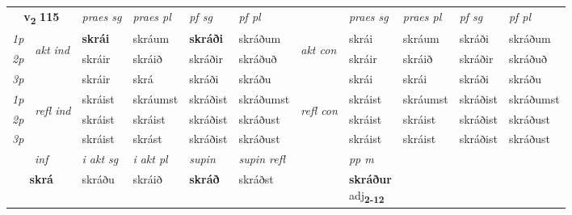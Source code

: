 \noindent
\begin{tabular}{lllllllllll} \toprule
\multicolumn{2}{c}{\textbf{v{\textsubscript{2}}} \Large{\textbf{115}}}  &  \textit{praes sg}  & \textit{praes pl}  &\textit{ pf sg} & \textit{pf pl} &  &  \textit{praes sg}  & \textit{praes pl}  & \textit{pf sg} & \textit{pf pl } \\*
	\cmidrule{3-6} \cmidrule{8-11}
 {\textit{1p}} & \multirow{3}{*}{\begin{turn}{90}\textit{akt ind}\end{turn}} & \textbf{skrái} & skráum & \textbf{skráði} & skráðum & \multirow{3}{*}{\begin{turn}{90}\textit{akt con}\end{turn}} &skrái & skráum & skráði & skráðum\\*
 {\textit{2p}} &  &  skráir  & skráið & skráðir & skráðuð & & skráir & skráið & skráðir & skráðuð \\*
{\textit{3p}} &  & skráir & skrá & skráði & skráðu & & skrái & skrái& skráði & skráðu \\*
\cmidrule{3-6} \cmidrule{8-11}
 {\textit{1p}} & \multirow{3}{*}{\begin{turn}{90}\textit{refl ind}\end{turn}}  & skráist & skráumst & skráðist & skráðumst & \multirow{3}{*}{\begin{turn}{90}\textit{refl con}\end{turn}}  &skráist & skráumst & skráðist & skráðumst \\*
 {\textit{2p}} &  & skráist & skráist & skráðist & skráðust & &skráist & skráist & skráðist & skráðust \\*
 {\textit{3p}}  & & skráist & skrást & skráðist & skráðust & & skráist & skráist& skráðist & skráðust \\*
\cmidrule{3-6} \cmidrule{8-11}

   \multicolumn{2}{c}{\textit{inf}}  & \textit{i akt sg} & \textit{i akt pl}    & \textit{supin} & \textit{supin refl} && \textit{pp m} \\*
  \multicolumn{2}{c}{\textbf{skrá}} & skráðu  & skráið    &  \textbf{skráð} & skráðst && \specialcell{\textbf{skráður} \\ adj\textbf{\textsubscript{2-12}}} \\*
\end{tabular}

